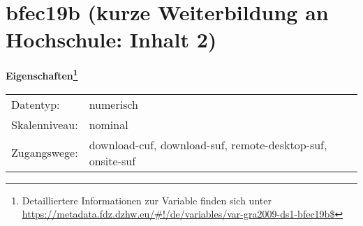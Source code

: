 
    \setcounter{footnote}{0}

    \vspace*{-1.8cm}
	\section{bfec19b (kurze Weiterbildung an Hochschule: Inhalt 2)}
	\label{section:bfec19b}



    \vspace*{0.5cm}
    \noindent\textbf{Eigenschaften\footnote{Detailliertere Informationen zur Variable finden sich unter
		\url{https://metadata.fdz.dzhw.eu/\#!/de/variables/var-gra2009-ds1-bfec19b$}}}\\
	\begin{tabularx}{\hsize}{@{}lX}
	Datentyp: & numerisch \\
	Skalenniveau: & nominal \\
	Zugangswege: &
	  download-cuf, 
	  download-suf, 
	  remote-desktop-suf, 
	  onsite-suf
 \\
    \end{tabularx}



